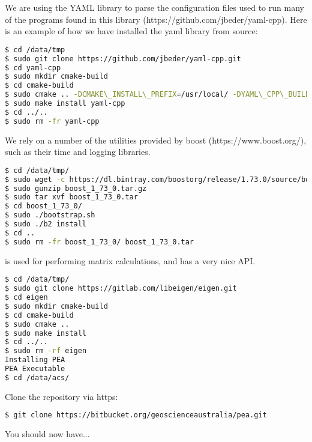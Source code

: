 We are using the YAML library to parse the configuration files used to run many of the programs found in this library (https://github.com/jbeder/yaml-cpp). Here is an example of how we have installed the yaml library from source:
\begin{lstlisting}[language=bash]
$ cd /data/tmp
$ sudo git clone https://github.com/jbeder/yaml-cpp.git
$ cd yaml-cpp
$ sudo mkdir cmake-build
$ cd cmake-build
$ sudo cmake .. -DCMAKE\_INSTALL\_PREFIX=/usr/local/ -DYAML\_CPP\_BUILD\_TESTS=OFF
$ sudo make install yaml-cpp
$ cd ../..
$ sudo rm -fr yaml-cpp
\end{lstlisting}

We rely on a number of the utilities provided by boost (https://www.boost.org/), such as their time and logging libraries.
\begin{lstlisting}[language=bash]
$ cd /data/tmp/
$ sudo wget -c https://dl.bintray.com/boostorg/release/1.73.0/source/boost_1_73_0.tar.gz
$ sudo gunzip boost_1_73_0.tar.gz
$ sudo tar xvf boost_1_73_0.tar
$ cd boost_1_73_0/
$ sudo ./bootstrap.sh
$ sudo ./b2 install
$ cd ..
$ sudo rm -fr boost_1_73_0/ boost_1_73_0.tar

\end{lstlisting}

 is used for performing matrix calculations, and has a very nice API.
\begin{lstlisting}[language=bash]
$ cd /data/tmp/
$ sudo git clone https://gitlab.com/libeigen/eigen.git
$ cd eigen
$ sudo mkdir cmake-build
$ cd cmake-build
$ sudo cmake ..
$ sudo make install
$ cd ../..
$ sudo rm -rf eigen
Installing PEA
PEA Executable
$ cd /data/acs/
\end{lstlisting}
Clone the repository via https:

\begin{lstlisting}[language=bash]
$ git clone https://bitbucket.org/geoscienceaustralia/pea.git
\end{lstlisting}
You should now have...

